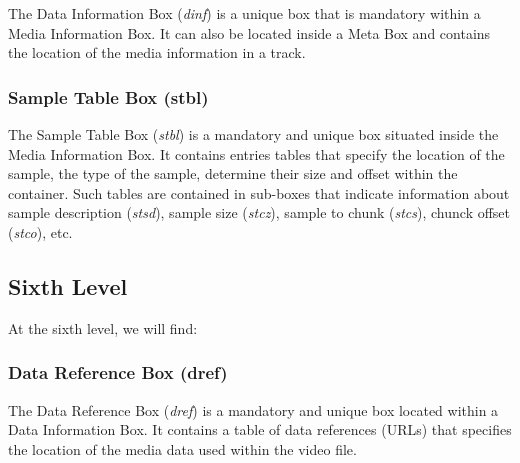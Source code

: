 The Data Information Box (\emph{dinf}) is a unique box that is mandatory within a Media Information Box. It can also be located inside a Meta Box and contains the location of the media information in a track.

\subsubsection*{Sample Table Box (stbl)}

The Sample Table Box (\emph{stbl}) is a mandatory and unique box situated inside the Media Information Box. It contains entries tables that specify the location of the sample, the type of the sample, determine their size and offset within the container. Such tables are contained in sub-boxes that indicate information about sample description (\emph{stsd}), sample size (\emph{stcz}), sample to chunk (\emph{stcs}), chunck offset (\emph{stco}), etc.

\subsection{Sixth Level}

At the sixth level, we will find:

\subsubsection*{Data Reference Box (dref)}

The Data Reference Box (\emph{dref}) is a mandatory and unique box located within a Data Information Box. It contains a table of data references (URLs) that specifies the location of the media data used within the video file.